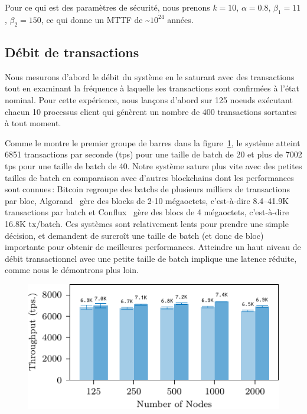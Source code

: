 Pour ce qui est des paramètres de sécurité, nous prenons $k = 10$, $\alpha = 0.8$, $\beta_1 = 11$, $\beta_2 = 150$,
ce qui donne un MTTF de \textasciitilde{}$10^{24}$ années.

\subsection{Débit de transactions}

Nous mesurons d'abord le débit du système en le saturant avec des transactions tout en examinant
la fréquence à laquelle les transactions sont confirmées à l'état nominal. Pour cette expérience, nous lançons
d'abord {\sysname} sur 125 noeuds exécutant chacun 10 processus client qui génèrent un nombre de
400 transactions sortantes à tout moment.

Comme le montre le premier groupe de barres dans la figure~\ref{fig:eval-thr}, le système atteint 6851
transactions par seconde (tps) pour une taille de batch de 20 et plus de 7002 tps pour une taille de
batch de 40. Notre système sature plus vite avec des petites tailles de batch en comparaison avec d'autres
blockchains dont les performances sont connues\,: Bitcoin regroupe des batchs de plusieurs milliers de
transactions par bloc, Algorand~\cite{GiladHMVZ17} gère des blocks de 2-10 mégaoctets, c'est-à-dire 8.4--41.9K
transactions par batch et Conflux~\cite{confluxLLXLC18} gère des blocs de 4 mégaoctets, c'est-à-dire 16.8K tx/batch.
Ces systèmes sont relativement lents pour prendre une simple décision, et demandent de surcroît une taille
de batch (et donc de bloc) importante pour obtenir de meilleures performances. Atteindre un haut niveau de débit
transactionnel avec une petite taille de batch implique une latence réduite, comme nous le démontrons plus loin.

\begin{figure}[h]
\includegraphics[width=\linewidth]{figures/thr-ava.pdf}
\label{fig:eval-thr}
\end{figure}

